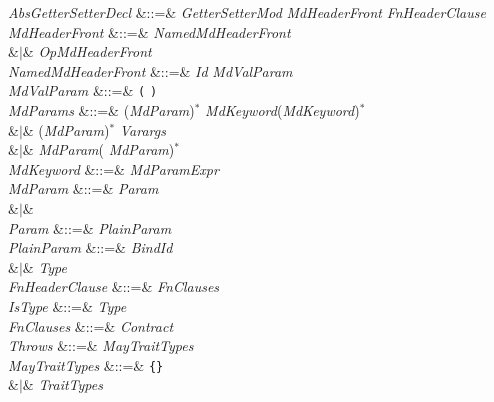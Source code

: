 \begin{Grammar}
\emph{AbsGetterSetterDecl} &::=&  
 \emph{GetterSetterMod} \emph{MdHeaderFront} \emph{FnHeaderClause} \\

\emph{MdHeaderFront}  &::=& \emph{NamedMdHeaderFront}\\
&$|$& \emph{OpMdHeaderFront} \\

\emph{NamedMdHeaderFront} &::=&
\emph{Id}  \emph{MdValParam} \\

\emph{MdValParam} &::=& \texttt(  \texttt) \\

\emph{MdParams}
&::=&
(\emph{MdParam}\EXP{,})$^*$  \emph{MdKeyword}(\EXP{,}\emph{MdKeyword})$^*$\\
&$|$&
(\emph{MdParam}\EXP{,})$^*$  \emph{Varargs}\\
&$|$& \emph{MdParam}(\EXP{,} \emph{MdParam})$^*$\\

\emph{MdKeyword} &::=& \emph{MdParam}\EXP{=}\emph{Expr} \\

\emph{MdParam} &::=& \emph{Param} \\
&$|$&  \\

\emph{Param} &::=& \emph{PlainParam}\\

\emph{PlainParam} &::=& \emph{BindId}  \\
&$|$& \emph{Type} \\

\emph{FnHeaderClause} &::=&  \emph{FnClauses} \\

\emph{IsType} &::=& \EXP{\mathrel{\mathtt{:}}} \emph{Type}\\

\emph{FnClauses} &::=&   \emph{Contract} \\

\emph{Throws} &::=&  \emph{MayTraitTypes}\\

\emph{MayTraitTypes} &::=& \texttt{\{\}} \\
&$|$& \emph{TraitTypes} \\

\end{Grammar}

